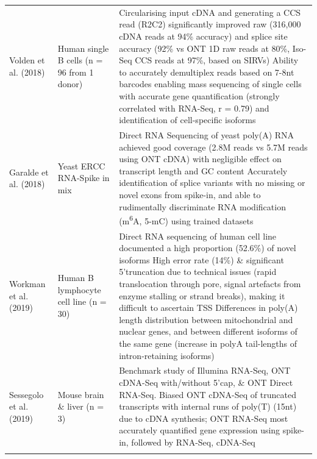 \begin{landscape}
\begin{longtable}[c]{p{4cm}p{4cm}p{18cm}}
		\centering Volden et al. (2018) \cite{Volden2018} &
		\centering Human single B cells (n = 96 from 1 donor) &
		\tabitem Circularising input cDNA and generating a CCS read (R2C2) significantly improved raw (316,000 cDNA reads at 94\% accuracy) and splice site accuracy (92\% vs ONT 1D raw reads at 80\%, Iso-Seq CCS reads at 97\%, based on SIRVs) \newline 
		\tabitem Ability to accurately demultiplex reads based on 7-8nt barcodes enabling mass sequencing of single cells with accurate gene quantification (strongly correlated with RNA-Seq, r = 0.79) and identification of cell-specific isoforms \\
		\hdashline[0.5pt/5pt]
		
		
		\centering Garalde et al. (2018) \cite{Garalde2018} &
		\centering Yeast \newline ERCC RNA-Spike in mix &
		\tabitem Direct RNA Sequencing of yeast poly(A) RNA achieved good coverage (2.8M reads vs 5.7M reads using ONT cDNA) with negligible effect on transcript length and GC content \newline 
		\tabitem Accurately identification of splice variants with no missing or novel exons from spike-in, and able to rudimentally discriminate RNA modification (m\textsuperscript{6}A, 5-mC) using trained datasets  \\
		
		\centering Workman et al. (2019) \cite{Workman2019a} &
		\centering Human B lymphocyte cell line (n = 30) &
		\tabitem Direct RNA sequencing of human cell line documented a high proportion (52.6\%) of novel isoforms \newline
		\tabitem High error rate (14\%) \& significant 5'truncation due to technical issues (rapid translocation through pore, signal artefacts from enzyme stalling or strand breaks), making it difficult to ascertain TSS \newline
		\tabitem Differences in poly(A) length distribution between mitochondrial and nuclear genes, and between different isoforms of the same gene (increase in polyA tail-lengths of intron-retaining isoforms) \\
		\hdashline[0.5pt/5pt]
		
		\centering Sessegolo et al. (2019) \cite{Sessegolo2019} &
		\centering Mouse brain \& liver \newline(n = 3) &
		\tabitem Benchmark study of Illumina RNA-Seq, ONT cDNA-Seq with/without 5'cap, \& ONT Direct RNA-Seq. \newline
		\tabitem Biased ONT cDNA-Seq of truncated transcripts with internal runs of poly(T) (15nt) due to cDNA synthesis; ONT RNA-Seq most accurately quantified gene expression using spike-in, followed by RNA-Seq, cDNA-Seq  \\
		\hdashline[0.5pt/5pt]
		

\end{longtable}
\end{landscape}
